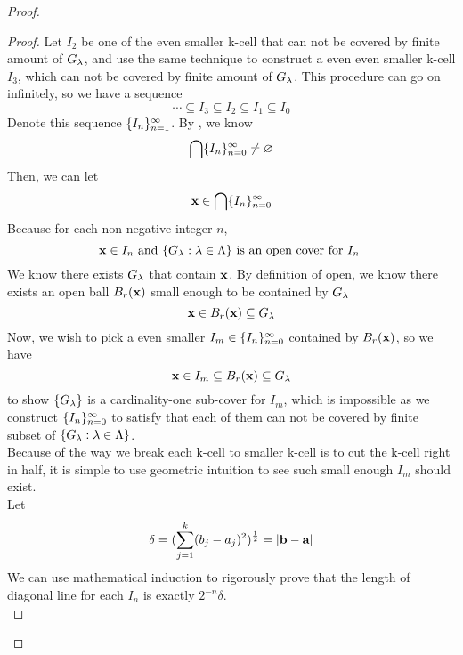 \documentclass{report}
\begin{document}
\begin{proof}
\begin{proof}
Let $I_2$ be one of the even smaller k-cell that can not be covered by finite amount of  $G_\lambda $, and use the same technique to construct a even even smaller k-cell $I_3$, which can not be covered by finite amount of $G_\lambda $. This procedure can go on infinitely, so we have a sequence
\begin{equation}
\cdots \subseteq I_3 \subseteq I_2\subseteq I_1\subseteq I_0
\end{equation}
Denote this sequence $\{ I_n \}_{n=1}^\infty$. By , we know 
\begin{equation}
\bigcap \{ I_n \}_{n=0}^\infty \neq \varnothing
\end{equation}
Then, we can let
\begin{equation}
\textbf{x}\in \bigcap \{ I_n \}_{n=0}^\infty
\end{equation}
Because for each non-negative integer $n$, 
\begin{equation}
\textbf{x}\in I_n\text{ and }\{ G_\lambda :\lambda \in\Lambda  \}\text{ is an open cover for $I_n$ }
\end{equation}
We know there exists $G_\lambda $ that contain $\textbf{x}$. By definition of open, we know there exists an open ball $B_r(\textbf{x})$ small enough to be contained by $G_\lambda $
\begin{equation}
\textbf{x}\in B_r(\textbf{x})\subseteq G_\lambda 
\end{equation}
Now, we wish to pick a even smaller $I_m \in \{ I_n \}_{n=0}^\infty$ contained by $B_r(\textbf{x})$, so we have
\begin{equation}
\textbf{x}\in I_m \subseteq B_r(\textbf{x})\subseteq G_\lambda 
\end{equation}
to show $\{ G_\lambda  \}$ is a cardinality-one sub-cover for $I_m$, which is impossible as we construct $\{ I_n \}_{n=0}^\infty$ to satisfy that each of them can not be covered by finite subset of $\{ G_\lambda :\lambda \in \Lambda  \}$.\\

Because of the way we break each k-cell to smaller k-cell is to cut the k-cell right in half, it is simple to use geometric intuition to see such small enough $I_m$ should exist.\\

Let
\begin{equation}
\delta=(\sum_{j=1}^k (b_j-a_j)^2)^{\frac{1}{2}}=\left|\textbf{b}-\textbf{a}\right|
\end{equation}
We can use mathematical induction to rigorously prove that the length of diagonal line for each $I_n$ is exactly $2^{-n}\delta$.\\


\end{proof}
\end{proof}
\end{document}
